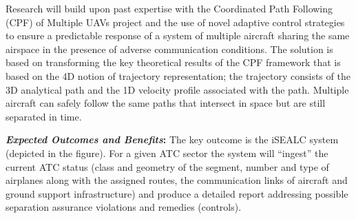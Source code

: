 \documentclass[letter,onecolumn,12pt]{aiaa-tc}
\newcommand{\1}{1_n}
\begin{document}
Research will build upon past expertise with the Coordinated Path Following (CPF) of Multiple UAVs project and
the use of novel adaptive control strategies to ensure a predictable response of a system of multiple aircraft
sharing the same airspace in the presence of adverse communication conditions.
The solution is based on transforming the key theoretical results of the CPF framework that is based on the 4D notion of trajectory representation; the trajectory consists of the 3D analytical path and the 1D velocity profile associated with the path. Multiple aircraft can safely follow the same paths that intersect in space but are still separated in time.


\medskip

\textbf{\emph{Expected Outcomes and Benefits}:} The key outcome is the iSEALC system (depicted in the figure). For a given ATC sector the system will ``ingest'' the current ATC status (class and geometry of the segment, number and type of airplanes along with the assigned routes,  the communication links of aircraft and ground support infrastructure) and produce a detailed report addressing possible separation assurance violations and remedies (controls).

\end{document}
